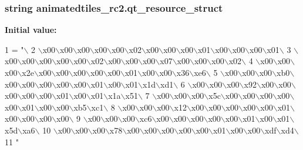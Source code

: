 \subsubsection[{qt\+\_\+resource\+\_\+struct}]{\setlength{\rightskip}{0pt plus 5cm}string animatedtiles\+\_\+rc2.\+qt\+\_\+resource\+\_\+struct}\label{namespaceanimatedtiles__rc2_a5fcfe806a0d7806d4274c2697987cb7f}
{\bfseries Initial value\+:}
\begin{DoxyCode}
1 = \textcolor{stringliteral}{"\(\backslash\)}
2 \textcolor{stringliteral}{\(\backslash\)x00\(\backslash\)x00\(\backslash\)x00\(\backslash\)x00\(\backslash\)x00\(\backslash\)x02\(\backslash\)x00\(\backslash\)x00\(\backslash\)x00\(\backslash\)x01\(\backslash\)x00\(\backslash\)x00\(\backslash\)x00\(\backslash\)x01\(\backslash\)}
3 \textcolor{stringliteral}{\(\backslash\)x00\(\backslash\)x00\(\backslash\)x00\(\backslash\)x00\(\backslash\)x00\(\backslash\)x02\(\backslash\)x00\(\backslash\)x00\(\backslash\)x00\(\backslash\)x07\(\backslash\)x00\(\backslash\)x00\(\backslash\)x00\(\backslash\)x02\(\backslash\)}
4 \textcolor{stringliteral}{\(\backslash\)x00\(\backslash\)x00\(\backslash\)x00\(\backslash\)x2e\(\backslash\)x00\(\backslash\)x00\(\backslash\)x00\(\backslash\)x00\(\backslash\)x00\(\backslash\)x01\(\backslash\)x00\(\backslash\)x00\(\backslash\)x36\(\backslash\)xe6\(\backslash\)}
5 \textcolor{stringliteral}{\(\backslash\)x00\(\backslash\)x00\(\backslash\)x00\(\backslash\)xb0\(\backslash\)x00\(\backslash\)x00\(\backslash\)x00\(\backslash\)x00\(\backslash\)x00\(\backslash\)x01\(\backslash\)x00\(\backslash\)x01\(\backslash\)x1d\(\backslash\)xd1\(\backslash\)}
6 \textcolor{stringliteral}{\(\backslash\)x00\(\backslash\)x00\(\backslash\)x00\(\backslash\)x92\(\backslash\)x00\(\backslash\)x00\(\backslash\)x00\(\backslash\)x00\(\backslash\)x00\(\backslash\)x01\(\backslash\)x00\(\backslash\)x01\(\backslash\)x1a\(\backslash\)x51\(\backslash\)}
7 \textcolor{stringliteral}{\(\backslash\)x00\(\backslash\)x00\(\backslash\)x00\(\backslash\)x5c\(\backslash\)x00\(\backslash\)x00\(\backslash\)x00\(\backslash\)x00\(\backslash\)x00\(\backslash\)x01\(\backslash\)x00\(\backslash\)x00\(\backslash\)xb5\(\backslash\)xc1\(\backslash\)}
8 \textcolor{stringliteral}{\(\backslash\)x00\(\backslash\)x00\(\backslash\)x00\(\backslash\)x12\(\backslash\)x00\(\backslash\)x00\(\backslash\)x00\(\backslash\)x00\(\backslash\)x00\(\backslash\)x01\(\backslash\)x00\(\backslash\)x00\(\backslash\)x00\(\backslash\)x00\(\backslash\)}
9 \textcolor{stringliteral}{\(\backslash\)x00\(\backslash\)x00\(\backslash\)x00\(\backslash\)xc6\(\backslash\)x00\(\backslash\)x00\(\backslash\)x00\(\backslash\)x00\(\backslash\)x00\(\backslash\)x01\(\backslash\)x00\(\backslash\)x01\(\backslash\)x5d\(\backslash\)xa6\(\backslash\)}
10 \textcolor{stringliteral}{\(\backslash\)x00\(\backslash\)x00\(\backslash\)x00\(\backslash\)x78\(\backslash\)x00\(\backslash\)x00\(\backslash\)x00\(\backslash\)x00\(\backslash\)x00\(\backslash\)x01\(\backslash\)x00\(\backslash\)x00\(\backslash\)xdf\(\backslash\)xd4\(\backslash\)}
11 \textcolor{stringliteral}{"}
\end{DoxyCode}
